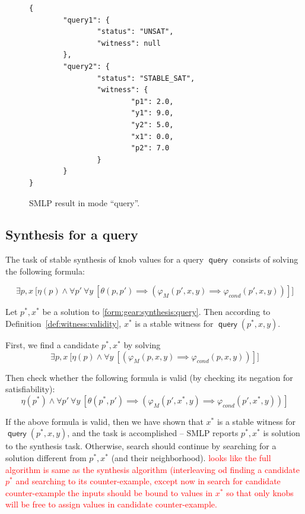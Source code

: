 \documentclass[a4paper,parskip=half]{article} %
\newcommand*\query{\operatorname{\mathsf{query}}}
\newcommand\todozk[1]{\textcolor{red}{#1}}
\newcommand*\ZK{\todozk}
\begin{document}
\begin{figure}
\small
\begin{verbatim}
{
        "query1": {
                "status": "UNSAT",
                "witness": null
        },
        "query2": {
                "status": "STABLE_SAT",
                "witness": {
                        "p1": 2.0,
                        "y1": 9.0,
                        "y2": 5.0,
                        "x1": 0.0,
                        "p2": 7.0
                }
        }
}
\end{verbatim}
\caption{SMLP result in mode ``query''.}\label{fig:query:result}
\end{figure}


\subsection{Synthesis for a query}


The task of stable synthesis of knob values for a query $\query$ consists of solving the following formula:

\begin{equation}\label{form:gear:synthesis:query}
    \exists p, x ~\big[ \eta(p) \wedge
    \forall p'~
    \forall y~[
    \theta(p,p') \implies (\varphi_M(p',x,y)  \implies  \varphi_{\mathit{cond}}(p',x,y))
    ]\big]
\end{equation} 

Let $p^*, x^*$ be a solution to \cref{form:gear:synthesis:query}. Then according to Definition~\ref{def:witness:validity}, 
$x^*$ is a stable witness for  $\query(p^*, x, y)$. 



First, we find a candidate $p^*, x^*$ by solving
\begin{equation}\label{form:gear:synthesis:query}
    \exists p, x ~\big[ \eta(p) \wedge
    \forall y~[
    (\varphi_M(p,x,y)  \implies  \varphi_{\mathit{cond}}(p,x,y))
    ]\big]
\end{equation} 

Then check whether the following formula is valid (by checking its negation for satisfiability): 
\begin{equation}\label{form:gear:synthesis:query}
    \eta(p^*) \wedge
    \forall p'~
    \forall y~[
    \theta(p^*,p') \implies (\varphi_M(p',x^*,y)  \implies  \varphi_{\mathit{cond}}(p',x^*,y))
    ]
\end{equation} 

If the above formula is valid, then we have shown that $x^*$ is a stable witness for  $\query(p^*, x, y)$, 
and the task is accomplished -- SMLP reports $p^*, x^*$ is solution to the synthesis task. Otherwise,
search should continue by searching for a solution different from $p^*, x^*$ (and their neighborhood).
\ZK{looks like the full algorithm is same as the synthesis algorithm (interleaving od finding a candidate $p^*$
and searching to its counter-example, except now in search for candidate counter-example the inputs should
be bound to values in $x^*$ so that only knobs will be free to assign values in candidate counter-example.}
\end{document}

